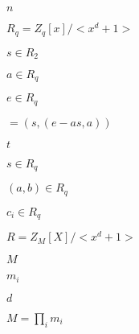 \documentclass{article}
\begin{document}
$n$
\pagebreak

$R_q = Z_q[x]/<x^d + 1>$
\pagebreak

$s \in R_2$
\pagebreak

$a \in R_q$
\pagebreak

$e \in R_q$
\pagebreak

$ = (s, (e - as, a))$
\pagebreak

$t$
\pagebreak

$s \in R_q$
\pagebreak

$(a, b) \in R_q$
\pagebreak

$c_i \in R_q$
\pagebreak

$R = Z_M[X] / <x^d + 1>$
\pagebreak

$M$
\pagebreak

$m_i$
\pagebreak

$d$
\pagebreak

$ M = \prod_i m_i $
\pagebreak
\end{document}
